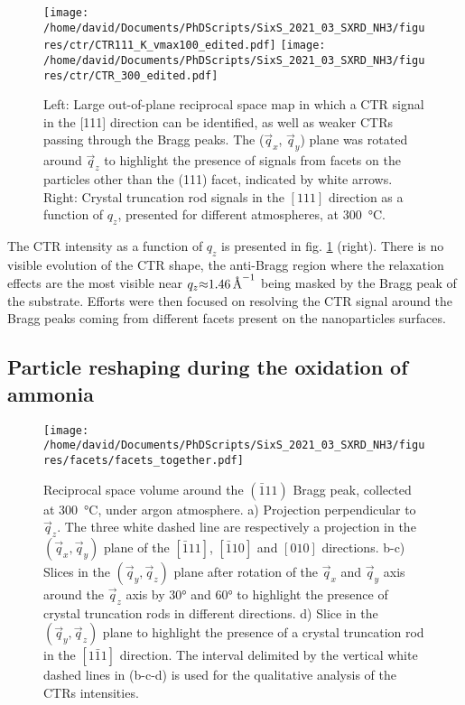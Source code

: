 \begin{figure}[!htb]
    \centering
    \texttt{[image: /home/david/Documents/PhDScripts/SixS\_2021\_03\_SXRD\_NH3/figures/ctr/CTR111\_K\_vmax100\_edited.pdf]}
    \texttt{[image: /home/david/Documents/PhDScripts/SixS\_2021\_03\_SXRD\_NH3/figures/ctr/CTR\_300\_edited.pdf]}
    \caption{
        Left: Large out-of-plane reciprocal space map in which a CTR signal in the [111] direction can be identified, as well as weaker CTRs passing through the Bragg peaks.
        The ($\vec{q}_x$, $\vec{q}_y$) plane was rotated around $\vec{q}_z$ to highlight the presence of signals from facets on the particles other than the (111) facet, indicated by white arrows.
        Right: Crystal truncation rod signals in the $[111]$ direction as a function of $q_z$, presented for different atmospheres, at \qty{300}{\degreeCelsius}.
    }
    \label{fig:2DCTR111Particles}
\end{figure}

The CTR intensity as a function of $q_z$ is presented in fig. \ref{fig:2DCTR111Particles} (right).
There is no visible evolution of the CTR shape, the anti-Bragg region where the relaxation effects are the most visible near $q_z \qty{\approx1.46}{\per\angstrom}$ being masked by the Bragg peak of the substrate.
Efforts were then focused on resolving the CTR signal around the Bragg peaks coming from different facets present on the nanoparticles surfaces.

\subsection{Particle reshaping during the oxidation of ammonia}

\begin{figure}[!htb]
    \centering
    \texttt{[image: /home/david/Documents/PhDScripts/SixS\_2021\_03\_SXRD\_NH3/figures/facets/facets\_together.pdf]}
    \caption{
        Reciprocal space volume around the $(\bar{1}11)$ Bragg peak, collected at \qty{300}{\degreeCelsius}, under argon atmosphere.
        a) Projection perpendicular to $\vec{q}_z$.
        The three white dashed line are respectively a projection in the $(\vec{q}_x, \vec{q}_y)$ plane of the $[\bar{1}11]$, $[\bar{1}10]$ and $[010]$ directions.
        b-c) Slices in the $(\vec{q}_y, \vec{q}_z)$ plane after rotation of the $\vec{q}_x$ and $\vec{q}_y$ axis around the $\vec{q}_z$ axis by \ang{30} and \ang{60} to highlight the presence of crystal truncation rods in different directions.
        d) Slice in the $(\vec{q}_y, \vec{q}_z)$ plane to highlight the presence of a crystal truncation rod in the $[1\bar{1}1]$ direction.
        The interval delimited by the vertical white dashed lines in (b-c-d) is used for the qualitative analysis of the CTRs intensities.
    }
    \label{fig:FacetMaps}
\end{figure}

